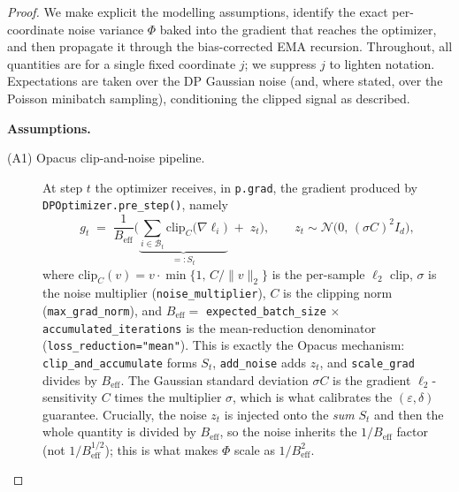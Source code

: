 \begin{proof}
We make explicit the modelling assumptions, identify the exact per-coordinate noise variance
$\Phi$ baked into the gradient that reaches the optimizer, and then propagate it through the
bias-corrected EMA recursion. Throughout, all quantities are for a single fixed coordinate
$j$; we suppress $j$ to lighten notation. Expectations are taken over the DP Gaussian noise
(and, where stated, over the Poisson minibatch sampling), conditioning the clipped signal as
described.

\medskip
\noindent\textbf{Assumptions.}
\begin{description}
  \item[(A1) Opacus clip-and-noise pipeline.] At step $t$ the optimizer receives, in
  \texttt{p.grad}, the gradient produced by \texttt{DPOptimizer.pre\_step()}, namely
  \[
    g_t \;=\; \frac{1}{B_{\mathrm{eff}}}\Big(\underbrace{\textstyle\sum_{i\in\mathcal B_t}\mathrm{clip}_C\!\big(\nabla\ell_i\big)}_{=: S_t}\;+\;z_t\Big),
    \qquad
    z_t \sim \mathcal N\!\big(0,\,(\sigma C)^2 I_d\big),
  \]
  where $\mathrm{clip}_C(v)=v\cdot\min\{1,\,C/\|v\|_2\}$ is the per-sample $\ell_2$ clip,
  $\sigma$ is the noise multiplier (\texttt{noise\_multiplier}), $C$ is the clipping norm
  (\texttt{max\_grad\_norm}), and $B_{\mathrm{eff}}=$ \texttt{expected\_batch\_size} $\times$ \texttt{accumulated\_iterations}
  is the mean-reduction denominator (\texttt{loss\_reduction="mean"}). This is exactly the
  Opacus mechanism: \texttt{clip\_and\_accumulate} forms $S_t$, \texttt{add\_noise} adds
  $z_t$, and \texttt{scale\_grad} divides by $B_{\mathrm{eff}}$. The Gaussian standard
  deviation $\sigma C$ is the gradient $\ell_2$-sensitivity $C$ times the multiplier $\sigma$,
  which is what calibrates the $(\varepsilon,\delta)$ guarantee. Crucially, the noise $z_t$ is
  injected onto the \emph{sum} $S_t$ and then the whole quantity is divided by $B_{\mathrm{eff}}$,
  so the noise inherits the $1/B_{\mathrm{eff}}$ factor (not $1/B_{\mathrm{eff}}^{1/2}$); this is
  what makes $\Phi$ scale as $1/B_{\mathrm{eff}}^2$.


\end{description}
\end{proof}
